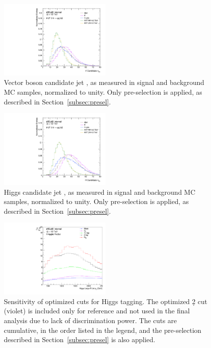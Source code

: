 \begin{figure}[htbp!]
\begin{center}
    \includegraphics[width=0.49\textwidth]{VHqqbb_SimpleSigBkgMC_ntrkVVJJ_V.pdf}
\end{center}
\caption{Vector boson candidate jet \ntrk, as measured in signal and background MC samples, normalized to unity. Only pre-selection is applied, as described in Section~\ref{subsec:presel}. }
\label{fig:simple_mc_ntrkV}
\end{figure}

\begin{figure}[htbp!]
\begin{center}
    \includegraphics[width=0.49\textwidth]{VHqqbb_SimpleSigBkgMC_ntrkVVJJ_H.pdf}
\end{center}
\caption{Higgs candidate jet \ntrk, as measured in signal and background MC samples, normalized to unity. Only pre-selection is applied, as described in Section~\ref{subsec:presel}. }
\label{fig:simple_mc_ntrkH}
\end{figure}

\begin{figure}[htbp!]
\begin{center}
    \includegraphics[width=0.49\textwidth]{PlotHTagSensitivityWithD2.pdf}
\end{center}
\caption{Sensitivity of optimized cuts for Higgs tagging. The optimized \d2 cut (violet) is included only for reference and not used in the final analysis due to lack of discrimination power.
    The cuts are cumulative, in the order listed in the legend, and the pre-selection described in Section~\ref{subsec:presel} is also applied.
}
\label{fig:htag_sens_d2}
\end{figure}

